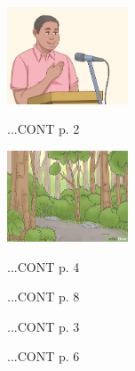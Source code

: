 \documentclass{article}
\begin{document}
\maketitle

\begin{floatingfigure}[l]{0.29\textwidth}
\includegraphics[width=0.27\textwidth]{images/img-02-04-01}
\end{floatingfigure}
\lipsum[1-2][2-17]
...CONT p. 2
\closearticle

\begin{floatingfigure}[r]{0.29\textwidth}
\includegraphics[width=0.27\textwidth]{images/img-02-04-02}
\end{floatingfigure}
\lipsum[3-4][1-19]
...CONT p. 4
\closearticle


\begin{multicols}{3}
\lipsum[6][1-5]
...CONT p. 8

\lipsum[7-8][1-11]
...CONT p. 3

\lipsum[11-12][3-10]
...CONT p. 6
\end{multicols}
\end{document}
